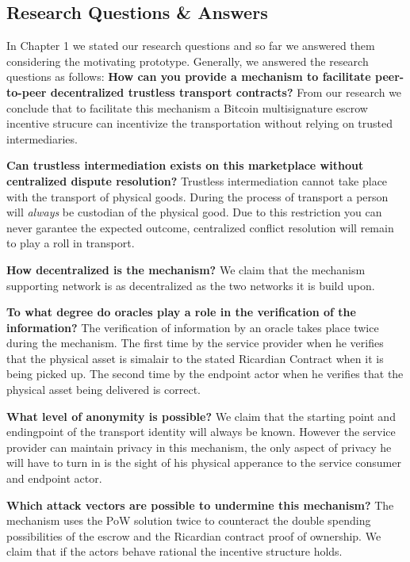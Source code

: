 \subsection{Research Questions \& Answers}

In Chapter 1 we stated our research questions and so far we answered them considering the motivating prototype. Generally, we answered the research questions as follows:
\bigbreak
\noindent \textbf{How can you provide a mechanism to facilitate peer-to-peer decentralized trustless transport contracts?} From our research we conclude that to facilitate this mechanism a Bitcoin multisignature escrow incentive strucure can incentivize the transportation without relying on trusted intermediaries.

\bigbreak
\noindent \textbf{Can trustless intermediation exists on this marketplace without centralized dispute resolution?} Trustless intermediation cannot take place with the transport of physical goods. During the process of transport a person will \textit{always} be custodian of the physical good. Due to this restriction you can never garantee the expected outcome, centralized conflict resolution will remain to play a roll in transport.

\bigbreak
\noindent \textbf{How decentralized is the mechanism?} We claim that the mechanism supporting network is as decentralized as the two networks it is build upon.

\bigbreak
\noindent \textbf{To what degree do oracles play a role in the verification of the information?} The verification of information by an oracle takes place twice during the mechanism. The first time by the service provider when he verifies that the physical asset is simalair to the stated Ricardian Contract when it is being picked up. The second time by the endpoint actor when he verifies that the physical asset being delivered is correct.

\bigbreak
\noindent \textbf{What level of anonymity is possible?} We claim that the starting point and endingpoint of the transport identity will always be known. However the service provider can maintain privacy in this mechanism, the only aspect of privacy he will have to turn in is the sight of his physical apperance to the service consumer and endpoint actor.

\bigbreak
\noindent \textbf{Which attack vectors are possible to undermine this mechanism?} The mechanism uses the PoW solution twice to counteract the double spending possibilities of the escrow and the Ricardian contract proof of ownership. We claim that if the actors behave rational the incentive structure holds.
\newpage

